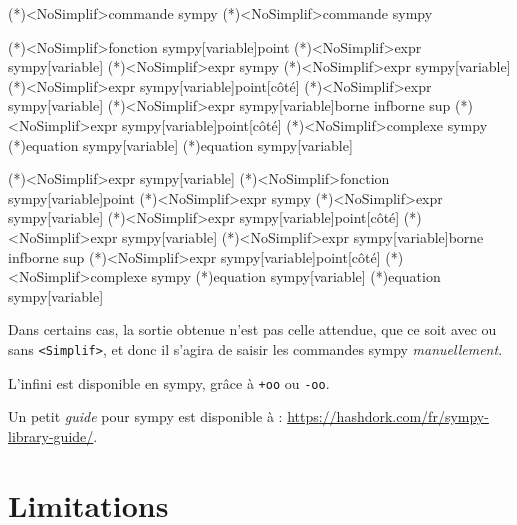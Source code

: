 \documentclass[french,a4paper,11pt]{article}
\begin{document}
\begin{bloctext}
\sympycalc(*)<NoSimplif>{commande sympy}
\dsympycalc(*)<NoSimplif>{commande sympy}

\sympyimage(*)<NoSimplif>{fonction sympy}[variable]{point}
\sympydev(*)<NoSimplif>{expr sympy}[variable]
\sympyfact(*)<NoSimplif>{expr sympy}
\sympyderiv(*)<NoSimplif>{expr sympy}[variable]
\sympynbderiv(*)<NoSimplif>{expr sympy}[variable]{point}[côté]
\sympyprim(*)<NoSimplif>{expr sympy}[variable]
\sympyintegr(*)<NoSimplif>{expr sympy}[variable]{borne inf}{borne sup}
\sympylim(*)<NoSimplif>{expr sympy}[variable]{point}[côté]
\sympyfexpo(*)<NoSimplif>{complexe sympy}
\sympyresol(*){equation sympy}[variable]
\sympyresolC(*){equation sympy}[variable]

\dsympydev(*)<NoSimplif>{expr sympy}[variable]
\dsympyimage(*)<NoSimplif>{fonction sympy}[variable]{point}
\dsympyfact(*)<NoSimplif>{expr sympy}
\dsympyderiv(*)<NoSimplif>{expr sympy}[variable]
\dsympynbderiv(*)<NoSimplif>{expr sympy}[variable]{point}[côté]
\dsympyprim(*)<NoSimplif>{expr sympy}[variable]
\dsympyintegr(*)<NoSimplif>{expr sympy}[variable]{borne inf}{borne sup}
\dsympylim(*)<NoSimplif>{expr sympy}[variable]{point}[côté]
\dsympyfexpo(*)<NoSimplif>{complexe sympy}
\dsympyresol(*){equation sympy}[variable]
\dsympyresolC(*){equation sympy}[variable]
\end{bloctext}

\begin{importantblock}
Dans certains cas, la sortie obtenue n'est pas celle attendue, que ce soit avec ou sans \texttt{<Simplif>}, et donc il s'agira de saisir les commandes \textsf{sympy} \textit{manuellement}.
\end{importantblock}

\begin{tipblock}
L'\og infini \fg{} est disponible en \textsf{sympy}, grâce à \texttt{+oo} ou \texttt{-oo}.

\smallskip

Un petit \textit{guide} pour \textsf{sympy} est disponible à : \url{https://hashdork.com/fr/sympy-library-guide/}.
\end{tipblock}

\section{Limitations}
\end{document}
